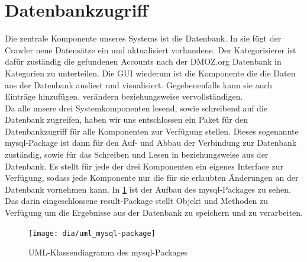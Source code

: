 \section{Datenbankzugriff}\label{sec:datenbankzugriff}
Die zentrale Komponente unseres Systems ist die Datenbank. In sie fügt der Crawler neue Datensätze ein und aktualisiert vorhandene. Der Kategorisierer ist dafür zuständig die gefundenen Accounts nach der DMOZ.org Datenbank in Kategorien zu unterteilen. Die GUI wiederum ist die Komponente die die Daten aus der Datenbank ausliest und visualisiert. Gegebenenfalls kann sie auch Einträge hinzufügen, verändern beziehungsweise vervollständigen.
\\Da alle unsere drei Systemkomponenten lesend, sowie schreibend auf die Datenbank zugreifen, haben wir uns entschlossen ein Paket für den Datenbankzugriff für alle Komponenten zur Verfügung stellen. Dieses sogenannte mysql-Package ist dann für den Auf- und Abbau der Verbindung zur Datenbank zuständig, sowie für das Schreiben und Lesen in beziehungsweise aus der Datenbank. Es stellt für jede der drei Komponenten ein eigenes Interface zur Verfügung, sodass jede Komponente nur die für sie erlaubten Änderungen an der Datenbank vornehmen kann.
In \cref{fig:mysql-package} ist der Aufbau des mysql-Packages zu sehen. Das darin eingeschlossene result-Package stellt Objekt und Methoden zu Verfügung um die Ergebnisse aus der Datenbank zu speichern und zu verarbeiten.

\begin{figure}[h!]
	\centering
	\texttt{[image: dia/uml\_mysql-package]}
	\caption{UML-Klassendiagramm des mysql-Packages}
	\label{fig:mysql-package}
\end{figure}

